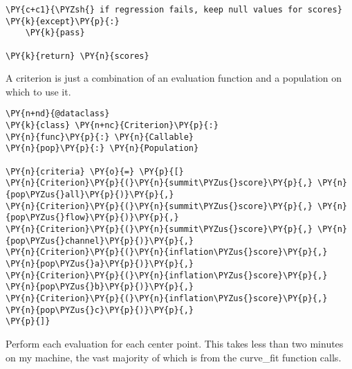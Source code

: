 \begin{tcolorbox}[breakable, size=fbox, boxrule=1pt, pad at break*=1mm,colback=cellbackground, colframe=cellborder]
\begin{Verbatim}[commandchars=\\\{\}]
\PY{c+c1}{\PYZsh{} if regression fails, keep null values for scores}
\PY{k}{except}\PY{p}{:}
    \PY{k}{pass}

\PY{k}{return} \PY{n}{scores}
\end{Verbatim}
\end{tcolorbox}

A criterion is just a combination of an evaluation function and a
population on which to use it.

\begin{tcolorbox}[breakable, size=fbox, boxrule=1pt, pad at break*=1mm,colback=cellbackground, colframe=cellborder]
\begin{Verbatim}[commandchars=\\\{\}]
\PY{n+nd}{@dataclass}
\PY{k}{class} \PY{n+nc}{Criterion}\PY{p}{:}
\PY{n}{func}\PY{p}{:} \PY{n}{Callable}
\PY{n}{pop}\PY{p}{:} \PY{n}{Population}

\PY{n}{criteria} \PY{o}{=} \PY{p}{[}
\PY{n}{Criterion}\PY{p}{(}\PY{n}{summit\PYZus{}score}\PY{p}{,} \PY{n}{pop\PYZus{}all}\PY{p}{)}\PY{p}{,}
\PY{n}{Criterion}\PY{p}{(}\PY{n}{summit\PYZus{}score}\PY{p}{,} \PY{n}{pop\PYZus{}flow}\PY{p}{)}\PY{p}{,}
\PY{n}{Criterion}\PY{p}{(}\PY{n}{summit\PYZus{}score}\PY{p}{,} \PY{n}{pop\PYZus{}channel}\PY{p}{)}\PY{p}{,}
\PY{n}{Criterion}\PY{p}{(}\PY{n}{inflation\PYZus{}score}\PY{p}{,} \PY{n}{pop\PYZus{}a}\PY{p}{)}\PY{p}{,}
\PY{n}{Criterion}\PY{p}{(}\PY{n}{inflation\PYZus{}score}\PY{p}{,} \PY{n}{pop\PYZus{}b}\PY{p}{)}\PY{p}{,}
\PY{n}{Criterion}\PY{p}{(}\PY{n}{inflation\PYZus{}score}\PY{p}{,} \PY{n}{pop\PYZus{}c}\PY{p}{)}\PY{p}{,}
\PY{p}{]}
\end{Verbatim}
\end{tcolorbox}

Perform each evaluation for each center point. This takes less than two
minutes on my machine, the vast majority of which is from the curve\_fit
function calls.

